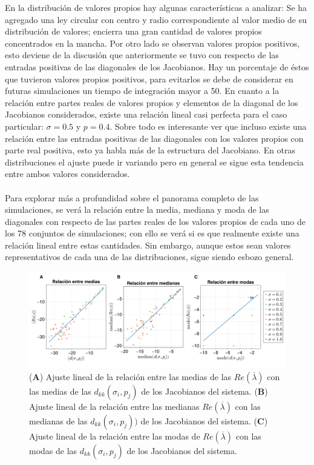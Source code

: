 \documentclass[a4paper,11pt]{book}
\theoremstyle{plain}
\theoremstyle{definition}
\begin{document}
En la distribución de valores propios hay algunas características a analizar: Se ha agregado una ley circular con centro y radio correspondiente al valor medio de su distribución de valores; encierra una gran cantidad de valores propios concentrados en la mancha. Por otro lado se observan valores propios positivos, esto deviene de la discusión que anteriormente se tuvo con respecto de las entradas positivas de las diagonales de los Jacobianos. Hay un porcentaje de éstos que tuvieron valores propios positivos, para evitarlos se debe de considerar en futuras simulaciones un tiempo de integración mayor a 50. En cuanto a la relación entre partes reales de valores propios y elementos de la diagonal de los Jacobianos considerados, existe una relación lineal casi perfecta para el caso particular: $\sigma=0.5$ y $p=0.4$. Sobre todo es interesante ver que incluso existe una relación entre las entradas positivas de las diagonales con los valores propios con parte real positiva, esto ya habla más de la estructura del Jacobiano. En otras distribuciones el ajuste puede ir variando pero en general se sigue esta tendencia entre ambos valores considerados.\\
\\
Para explorar más a profundidad sobre el panorama completo de las simulaciones, se verá la relación entre la media, mediana y moda de las diagonales con respecto de las partes reales de los valores propios de cada uno de los 78 conjuntos de simulaciones; con ello se verá si es que realmente existe una relación lineal entre estas cantidades. Sin embargo, aunque estos sean valores representativos de cada una de las distribuciones, sigue siendo esbozo general.
\begin{figure}[h!]
	\centering
	\includegraphics[scale=0.16]{../Imagenes/AjustesLinMeds}
	\caption{(\textbf{A}) Ajuste lineal de la relación entre las medias de las $Re(\overline{\lambda})$ con las medias de las $d_{kk}(\sigma_i,p_j)$ de los Jacobianos del sistema. (\textbf{B}) Ajuste lineal de la relación entre las medianas $Re(\overline{\lambda})$ con las medianas de las $d_{kk}(\sigma_i,p_j))$ de los Jacobianos del sistema. (\textbf{C}) Ajuste lineal de la relación entre las modas de $Re(\overline{\lambda})$ con las modas de las $d_{kk}(\sigma_i,p_j)$ de los Jacobianos del sistema.}
	\label{fig:AjustesLinMeds}
\end{figure}
\end{document}
